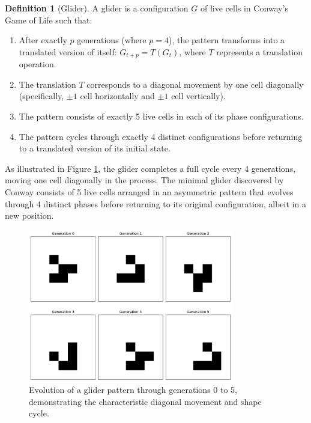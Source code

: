 \documentclass{article}
\theoremstyle{definition}
\newtheorem{definition}{Definition}[section]
\theoremstyle{plain}
\theoremstyle{plain}
\begin{document}
\begin{definition}[Glider]
A glider is a configuration $G$ of live cells in Conway's Game of Life such that:
\begin{enumerate}
    \item After exactly $p$ generations (where $p = 4$), the pattern transforms into a translated version of itself: $G_{t+p} = T(G_t)$, where $T$ represents a translation operation.
    \item The translation $T$ corresponds to a diagonal movement by one cell diagonally (specifically, $\pm 1$ cell horizontally and $\pm 1$ cell vertically).
    \item The pattern consists of exactly 5 live cells in each of its phase configurations.
    \item The pattern cycles through exactly 4 distinct configurations before returning to a translated version of its initial state.
\end{enumerate}
\end{definition}

As illustrated in Figure \ref{fig:glider-generations}, the glider completes a full cycle every 4 generations, moving one cell diagonally in the process. The minimal glider discovered by Conway consists of 5 live cells arranged in an asymmetric pattern that evolves through 4 distinct phases before returning to its original configuration, albeit in a new position.

\begin{figure}[H]
  \centering
  \includegraphics[width=0.8\textwidth]{figures/glider_generations_0_to_5.png}
  \caption{Evolution of a glider pattern through generations 0 to 5, demonstrating the characteristic diagonal movement and shape cycle.}
  \label{fig:glider-generations}
\end{figure}
\end{document}
